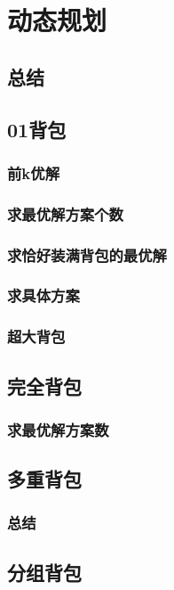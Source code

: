 \documentclass[10pt,a4paper]{article}
\begin{document}
	\section{动态规划}
	\subsection{总结}
	
	\subsection{01背包}
	\subsubsection{前k优解}
	
	\subsubsection{求最优解方案个数}
	
	\subsubsection{求恰好装满背包的最优解}
	
	\subsubsection{求具体方案}
	
	\subsubsection{超大背包}
	
	\subsection{完全背包}
	\subsubsection{求最优解方案数}
	
	\subsection{多重背包}
	\subsubsection{总结}
	
	\subsection{分组背包}
\end{document}
